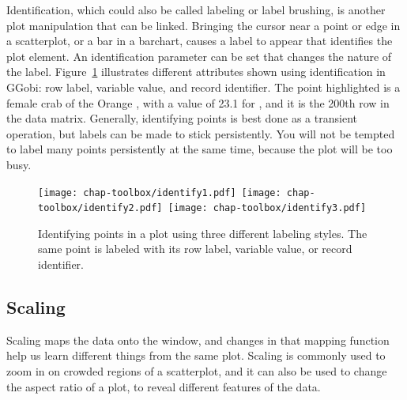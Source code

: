 
Identification, which could also be called labeling or label brushing,
is another plot manipulation that can be linked.  Bringing the cursor
near a point or edge in a scatterplot, or a bar in a barchart, causes
a label to appear that identifies the plot element.  An
identification parameter can be set that changes the nature of the
label.  Figure~\ref{identify} illustrates different attributes shown
using identification in GGobi: row label, variable value, and record
identifier. The point highlighted is a female crab of the Orange
, with a value of 23.1 for , and it is
the 200th row in the data matrix. Generally, identifying points is
best done as a transient operation, but labels can be made to stick
persistently. You will not be tempted to label many points persistently
at the same time, because the plot will be too busy.

\begin{figure}[htp]
\hbox{{\texttt{[image: chap-toolbox/identify1.pdf]}}
 {\texttt{[image: chap-toolbox/identify2.pdf]}}
 {\texttt{[image: chap-toolbox/identify3.pdf]}}}
\caption[Identifying points in a plot using three different labeling
styles]{Identifying points in a plot using three different labeling
styles.  The same point is labeled with its row label, variable value,
or record identifier.}
\label{identify}
\end{figure}

\subsection{Scaling}


Scaling maps the data onto the window, and changes in that mapping
function help us learn different things from the same plot.  Scaling
is commonly used to zoom in on crowded regions of a scatterplot, and
it can also be used to change the aspect ratio of a plot, to reveal
different features of the data.

